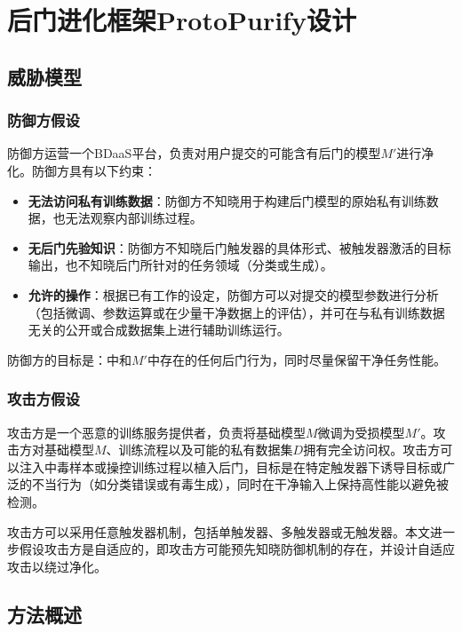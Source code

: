 
\chapter{后门进化框架ProtoPurify设计}

\section{威胁模型}

\subsection{防御方假设}

防御方运营一个BDaaS平台，负责对用户提交的可能含有后门的模型$M'$进行净化。防御方具有以下约束：
\begin{itemize}[leftmargin=2em]
    \item \textbf{无法访问私有训练数据}：防御方不知晓用于构建后门模型的原始私有训练数据，也无法观察内部训练过程。
    \item \textbf{无后门先验知识}：防御方不知晓后门触发器的具体形式、被触发器激活的目标输出，也不知晓后门所针对的任务领域（分类或生成）。
    \item \textbf{允许的操作}：根据已有工作的设定，防御方可以对提交的模型参数进行分析（包括微调、参数运算或在少量干净数据上的评估），并可在与私有训练数据无关的公开或合成数据集上进行辅助训练运行。
\end{itemize}

防御方的目标是：中和$M'$中存在的任何后门行为，同时尽量保留干净任务性能。

\subsection{攻击方假设}

攻击方是一个恶意的训练服务提供者，负责将基础模型$M$微调为受损模型$M'$。攻击方对基础模型$M$、训练流程以及可能的私有数据集$D$拥有完全访问权。攻击方可以注入中毒样本或操控训练过程以植入后门，目标是在特定触发器下诱导目标或广泛的不当行为（如分类错误或有毒生成），同时在干净输入上保持高性能以避免被检测。

攻击方可以采用任意触发器机制，包括单触发器、多触发器或无触发器。本文进一步假设攻击方是自适应的，即攻击方可能预先知晓防御机制的存在，并设计自适应攻击以绕过净化。

\section{方法概述}

